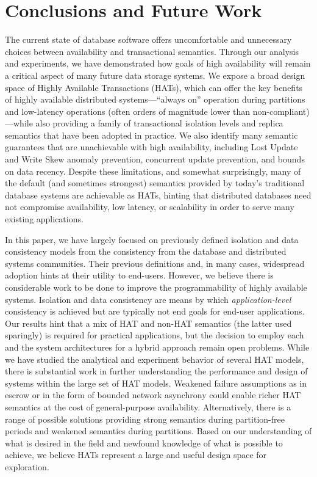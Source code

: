
\section{Conclusions and Future Work}
\label{sec:conclusion}

The current state of database software offers uncomfortable and
unnecessary choices between availability and transactional semantics.
Through our analysis and experiments, we have demonstrated how goals
of high availability will remain a critical aspect of many future data
storage systems. We expose a broad design space of Highly Available
Transactions (HATs), which can offer the key benefits of highly
available distributed systems---``always on'' operation during
partitions and low-latency operations (often orders of magnitude lower
than non-compliant)---while also providing a family of transactional
isolation levels and replica semantics that have been adopted in
practice.  We also identify many semantic guarantees that are
unachievable with high availability, including Lost Update and Write
Skew anomaly prevention, concurrent update prevention, and bounds on
data recency. Despite these limitations, and somewhat surprisingly,
many of the default (and sometimes strongest) semantics provided by
today's traditional database systems are achievable as HATs, hinting
that distributed databases need not compromise availability, low
latency, or scalability in order to serve many existing applications.

In this paper, we have largely focused on previously defined isolation
and data consistency models from the consistency from the database and
distributed systems communities. Their previous definitions and, in
many cases, widespread adoption hints at their utility to
end-users. However, we believe there is considerable work to be done
to improve the programmability of highly available systems. Isolation
and data consistency are means by which \textit{application-level}
consistency is achieved but are typically not end goals for end-user
applications. Our results hint that a mix of HAT and non-HAT semantics
(the latter used sparingly) is required for practical applications,
but the decision to employ each and the system architectures for a
hybrid approach remain open problems. While we have studied the
analytical and experiment behavior of several HAT models, there is
substantial work in further understanding the performance and design
of systems within the large set of HAT models. Weakened failure
assumptions as in escrow or in the form of bounded network asynchrony
could enable richer HAT semantics at the cost of general-purpose
availability. Alternatively, there is a range of possible solutions
providing strong semantics during partition-free periods and weakened
semantics during partitions. Based on our understanding of what is
desired in the field and newfound knowledge of what is possible to
achieve, we believe HATs represent a large and useful design space for
exploration.

